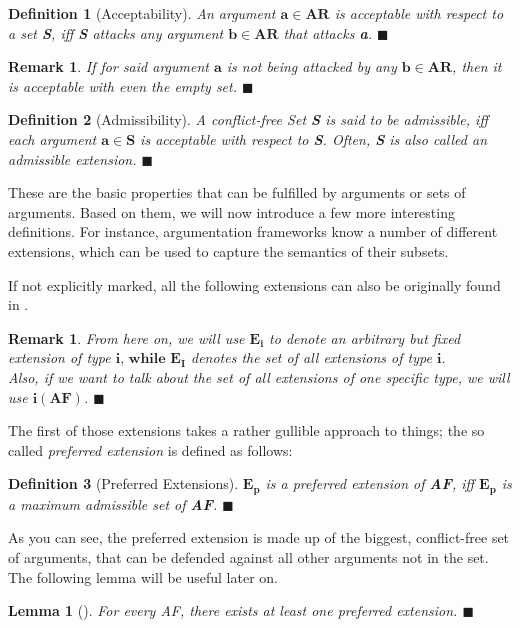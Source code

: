 \documentclass[12pt]{report}
\numberwithin{figure}{chapter}
\theoremstyle{break}
\newtheorem{defn}{Definition}[chapter]
\newtheorem{lem}{Lemma}[chapter]
\newtheorem*{rmrk}{Remark}
\newtheorem*{frmrk}{Remark}
\newenvironment{mydefn}{\begin{defn}}{$\blacksquare$ \end{defn}}
\newenvironment{mylem}{\begin{lem}}{$\blacksquare$ \end{lem}}
\newenvironment{myrmrk}{\begin{rmrk}}{$\blacksquare$ \end{rmrk}}
\newenvironment{myfrmrk}{\begin{frmrk}}{$\blacksquare$ \end{frmrk}}
\begin{document}
\begin{mydefn}[Acceptability]
An argument $\bm{a \in AR}$ is acceptable with respect to a set \textbf{S}, iff \textbf{S} attacks any argument $\bm{b \in AR}$ that attacks \textbf{a}. 
\end{mydefn}

\begin{myfrmrk}
If for said argument $\bm{a}$ is not being attacked by any $\bm{b \in AR}$, then it is acceptable with even the empty set.
\end{myfrmrk}

\begin{mydefn}[Admissibility]
A conflict-free Set \textbf{S} is said to be admissible, iff each argument $\bm{a \in S}$ is acceptable with respect to \textbf{S}.
Often, \textbf{S} is also called an admissible extension.
\label{admissible}
\end{mydefn}

These are the basic properties that can be fulfilled by arguments or sets of arguments. Based on them, we will now introduce a few more interesting definitions.
For instance, argumentation frameworks know a number of different extensions, which can be used to capture the semantics of their subsets. 

\newpage
If not explicitly marked, all the following extensions can also be originally found in \cite{Dung}.

\begin{myrmrk}
From here on, we will use $\bm{E_{i}}$ to denote an arbitrary but fixed extension of type $\bm{i \text{, while } E_{I}}$ denotes the set of all extensions of type $\bm{i}$.\\
Also, if we want to talk about the set of all extensions of one specific type, we will use $\bm{i(AF)}$.
\end{myrmrk}

The first of those extensions takes a rather gullible approach to things; the so called \textit{preferred extension} is defined as follows:

\begin{mydefn}[Preferred Extensions]
$\bm{E_{p}}$ is a preferred extension of \textbf{AF}, iff $\bm{E_{p}}$ is a maximum admissible set of \textbf{AF}.
\end{mydefn}

As you can see, the preferred extension is made up of the biggest, conflict-free set of arguments, that can be defended against all other arguments not in the set.\\
The following lemma will be useful later on.
\begin{mylem}[\cite{Dung}]
For every AF, there exists at least one preferred extension.
\end{mylem}
\end{document}
